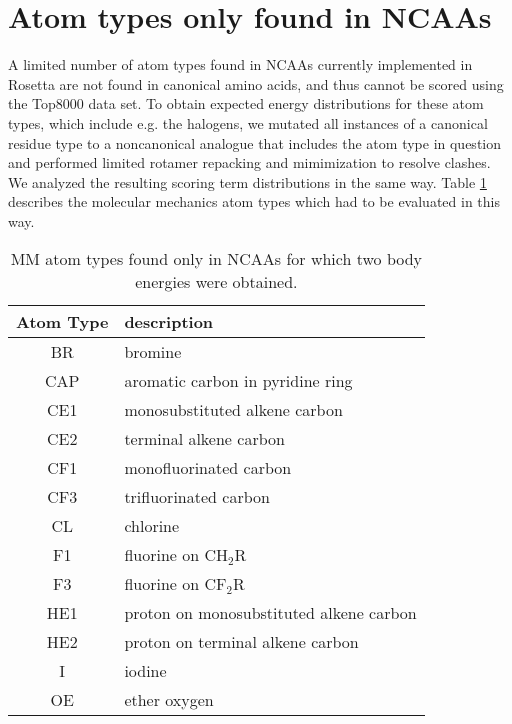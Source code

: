 \section{Atom types only found in NCAAs}
A limited number of atom types found in NCAAs currently implemented in Rosetta are not found in canonical amino acids, and thus cannot be scored using the Top8000 data set.
To obtain expected energy distributions for these atom types, which include e.g. the halogens, we mutated all instances of a canonical residue type to a noncanonical analogue that includes the atom type in question and performed limited rotamer repacking and mimimization to resolve clashes.
We analyzed the resulting scoring term distributions in the same way.
Table \ref{suptab:atypes_all} describes the molecular mechanics atom types which had to be evaluated in this way.


\begin{table}
  \centering
  \caption{MM atom types found only in NCAAs for which two body energies were obtained.}
  \label{suptab:atypes_all}

  \begin{tabular}{c|l}
    \toprule
    Atom Type & description\\
    \midrule
    BR & bromine\\
    CAP & aromatic carbon in pyridine ring\\
    CE1 & monosubstituted alkene carbon\\
    CE2 & terminal alkene carbon\\
    CF1 & monofluorinated carbon\\
    CF3 & trifluorinated carbon\\
    CL & chlorine\\
    F1 & fluorine on CH$_2$R\\
    F3 & fluorine on CF$_2$R\\
    HE1 & proton on monosubstituted alkene carbon \\
    HE2 & proton on terminal alkene carbon\\
    I & iodine\\
    OE & ether oxygen\\
    \bottomrule
  \end{tabular}
\end{table}
